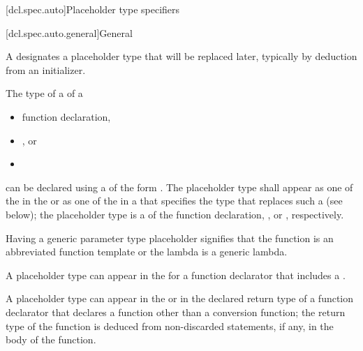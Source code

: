 [dcl.spec.auto]{Placeholder type specifiers}%

[dcl.spec.auto.general]{General}%
%

\begin{bnf}
\br
   \br
    \terminal{(}  \terminal{)}
\end{bnf}

\pnum
A 
designates a placeholder type that will be replaced later,
typically by deduction
from an initializer.

\pnum
The type of a  of a
\begin{itemize}
  \item function declaration,
  \item {}, or
  \item {}
\end{itemize}
can be declared using
a  of the form
 .
The placeholder type shall appear
as one of the  in
the  or
as one of the  in
a 
that specifies the type that replaces such
a  (see below);
the placeholder type
is a 
of the
function declaration,
, or
, respectively.
\begin{note}
Having a generic parameter type placeholder
signifies that the function is
an abbreviated function template or
the lambda is a generic lambda.
\end{note}

\pnum
A placeholder type can appear in
the  for a function declarator
that includes a .

\pnum
A placeholder type can appear in
the  or 
in the declared return type of a function declarator
that declares a function other than a conversion function;
the return type of the function is
deduced from non-discarded  statements, if any, in the body
of the function.

